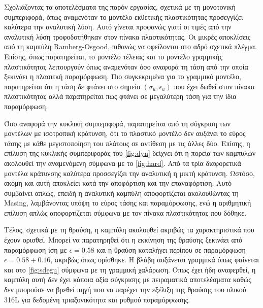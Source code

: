 \documentclass{article}
\begin{document}
Σχολιάζοντας τα αποτελέσματα της παρόν εργασίας, σχετικά με τη μονοτονική συμπεριφορά, όπως αναμενόταν το μοντέλο εκθετικής πλαστικότητας προσεγγίζει καλύτερα την αναλυτική λύση. Αυτό γίνεται προφανώς γιατί οι τιμές από την αναλυτική λύση τροφοδοτήθηκαν στον πίνακα πλαστικότητας. Οι μικρές αποκλίσεις από τη καμπύλη Ramberg-Osgood, πιθανώς να οφείλονται στο αδρό σχετικά πλέγμα. Επίσης, όπως παρατηρείται, το μοντέλο τέλειας και το μοντέλο γραμμικής πλαστικότητας λειτουργούν όπως αναμενόταν όσο αναφορά τη τάση από την οποία ξεκινάει η πλασιτκή παραμόρφωση. Πιο συγκεκριμένα για το γραμμικό μοντέλο, παρατηρείται ότι η τάση δε φτάνει στο σημείο $(\sigma_u, \epsilon_u)$ που έχει δωθεί στον πίνακα πλαστικότητας αλλά παρατηρείται πως φτάνει σε μεγαλύτερη τάση για την ίδια παραμόρφωση.
\par Όσο αναφορά την κυκλική συμπεριφορά, παρατηρείται από τη σύγκριση των μοντέλων με ισοτροπική κράτυνση, ότι το πλαστικό μοντέλο δεν αυξάνει το εύρος τάσης με κάθε μεγιστοποίηση του πλάτους σε αντίθεση με τις άλλες δύο. Επίσης, η επίλυση της κυκλικής συμπεριφοράς του \ref{fig:dyn} δείχνει ότι η πορεία των καμπυλών ακολουθεί την αναμενόμενη σύμφωνα με το \ref{fig:hard}. Από τα τρία διαφορετικά μοντέλα κράτυνσης καλύτερα προσσεγίζει την αναλυτική η μικτή κράτυνση. Ωστόσο, ακόμη και αυτή αποκλείει κατά την αποφόρτιση και την επαναφόρτιση. Αυτό συμβαίνει απλώς, επειδή η αναλυτική καμπύλη αποφορτίζεται ακολουθώντας τη Masing, λαμβάνοντας υπόψη το εύρος τάσης και παραμόρφωσης, ενώ η αριθμητική επίλυση απλώς αποφορτίζεται σύμφωνα με τον πίνακα πλαστικότητας που δόθηκε.
\par Τέλος, σχετικά με τη θραύση, η καμπύλη ακολουθεί ακριβώς τα χαρακτηριστικά που έχουν ορισθεί. Μπορεί να παρατηρηθεί ότι η εκκίνηση της θραύσης ξεκινάει από παραμόρφωση ίση με $\epsilon = 0.58$ και η θραύση καταλήγει περίπου σε παραμόρφωση $\epsilon = 0.58 + 0.16$, ακριβώς όπως ορίσθηκε. Η βλάβη αυξάνεται γραμμικά όπως φαίνεται και στο \ref{fig:sdegu} σύμφωνα με τη γραμμική χαλάρωση. Όπως έχει  ήδη αναφερθεί, η καμπύλη αυτή δεν έχει κάποια αξία σύγκρισης με πειραματικά αποτελέσματα καθώς δεν μπορούσε να βρεθεί πηγή που να παρέχει την εξέλιξη της θραύσης του υλικού 316L για δεδομένη τριαξονικότητα και ρυθμού παραμόρφωσης.










\listoffigures
\listoftables

\nocite{*}
\printbibliography
\end{document}
